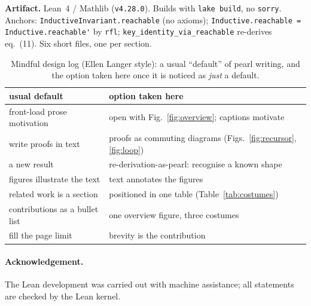\documentclass[runningheads]{llncs}
\begin{document}
\begin{artifact}
\textbf{Artifact.} Lean~4 / Mathlib (\texttt{v4.28.0}). Builds with
\texttt{lake build}, no \lstinline[style=lean]|sorry|.
Anchors: \lstinline[style=lean]|InductiveInvariant.reachable| (no axioms);
\lstinline[style=lean]|Inductive.reachable = Inductive.reachable'| by
\lstinline[style=lean]|rfl|; \lstinline[style=lean]|key_identity_via_reachable|
re-derives eq.~(11). Six short files, one per section.
\end{artifact}

\begin{table}[H]
\centering
\caption{Mindful design log (Ellen Langer style): a usual ``default'' of pearl
writing, and the option taken here once it is noticed as \emph{just} a default.}
\label{tab:mindful}
\renewcommand{\arraystretch}{1.15}
\small
\begin{tabular}{@{}ll@{}}
\toprule
\textbf{usual default} & \textbf{option taken here}\\
\midrule
front-load prose motivation      & open with Fig.~\ref{fig:overview}; captions motivate\\
write proofs in text             & proofs as commuting diagrams (Figs.~\ref{fig:recursor},\ref{fig:loop})\\
a new result                     & re-derivation-as-pearl: recognise a known shape\\
figures illustrate the text      & text annotates the figures\\
related work is a section        & positioned in one table (Table~\ref{tab:costumes})\\
contributions as a bullet list   & one overview figure, three costumes\\
fill the page limit              & brevity is the contribution\\
\bottomrule
\end{tabular}
\end{table}

\paragraph{Acknowledgement.} The Lean development was carried out with
machine assistance; all statements are checked by the Lean kernel.
\end{document}
